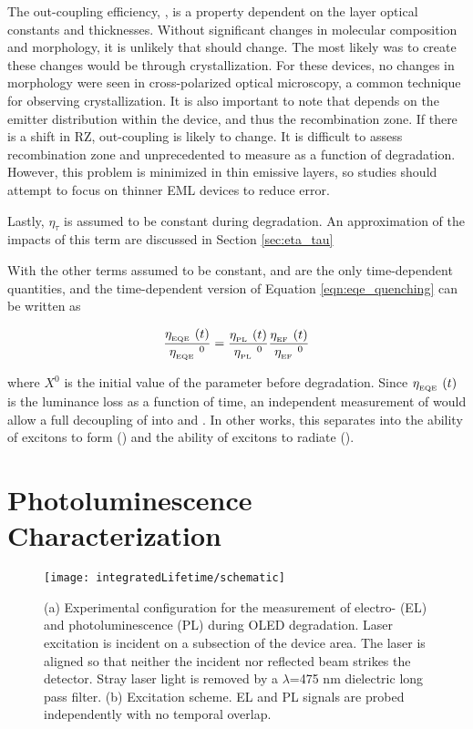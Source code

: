 \documentclass[../thesis.tex]{subfiles}
\begin{document}
The out-coupling efficiency, \oc, is a property dependent on the layer optical constants and thicknesses.
Without significant changes in molecular composition and morphology, it is unlikely that \oc should change.
The most likely was to create these changes would be through crystallization.  
For these devices, no changes in morphology were seen in cross-polarized optical microscopy, a common technique for observing crystallization.\supercite{Fielitz2016}
It is also important to note that \oc depends on the emitter distribution within the device, and thus the recombination zone.
If there is a shift in RZ, out-coupling is likely to change.  
It is difficult to assess recombination zone and unprecedented to measure as a function of degradation.
However, this problem is minimized in thin emissive layers, so studies should attempt to focus on thinner EML devices to reduce error.

Lastly, $\eta_\tau$ is assumed to be constant during degradation.
An approximation of the impacts of this term are discussed in Section \ref{sec:eta_tau}

With the other terms assumed to be constant, \pl and \ef are the only time-dependent quantities, and the time-dependent version of Equation \ref{eqn:eqe_quenching} can be written as


\begin{equation}
\frac{\eta_{_\text{\tiny EQE}}\ (t)}{\eta_{_\text{\tiny EQE}}\ ^0}=\frac{\eta_{_\text{\tiny PL}}\ (t)}{\eta_{_\text{\tiny PL}}\ ^0}\frac{\eta_{_\text{\tiny EF}}\ (t)}{\eta_{_\text{\tiny EF}}\ ^0}
\label{eqn_eqe_decay_components}
\end{equation}

where $X^0$ is the initial value of the parameter before degradation.
Since $\eta_{_\text{\tiny EQE}}\ (t)$ is the luminance loss as a function of time, an independent measurement of \pl would allow a full decoupling of \eqe into \pl and \ef.
In other works, this separates \eqe into the ability of excitons to form (\ef) and the ability of excitons to radiate (\pl).

\section{Photoluminescence Characterization}
\begin{figure}[ht]
\centering
\texttt{[image: integratedLifetime/schematic]}
\caption{(a) Experimental configuration for the measurement of electro- (EL) and photoluminescence (PL) during OLED degradation.  Laser excitation is incident on a subsection of the device area.  The laser is aligned so that neither the incident nor reflected beam strikes the detector.  Stray laser light is removed by a $\lambda$=475 nm dielectric long pass filter.  (b) Excitation scheme.  EL and PL signals are probed independently with no temporal overlap.  }
\label{fig:schematic}
\end{figure}
\end{document}
